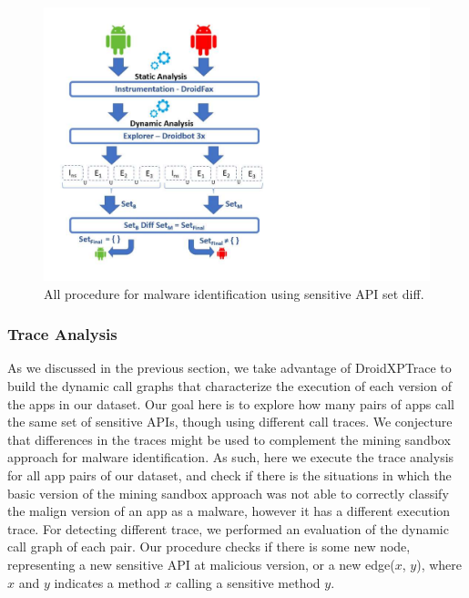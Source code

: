 
\begin{figure}[ht]
\centering
\includegraphics[scale=0.4]{images/sensitiveAPIdiff.pdf}
\caption{All procedure for malware identification using sensitive API set diff.}
 \label{fig:sensitiveAPI}
\end{figure}




\subsubsection{Trace Analysis} \label{sec:pathsetup}


As we discussed in the previous section, we take advantage of DroidXPTrace to build the dynamic call graphs that characterize the execution of each version of the apps in our dataset. Our goal
here is to explore how many pairs of apps call the same set of sensitive APIs, though using different call
traces. We conjecture that differences in the traces might be used to complement the mining sandbox
approach for malware identification. As such, here we execute the trace
analysis for all app pairs of our dataset, and check if there is the situations in which the basic version of the mining sandbox approach was not able to correctly classify the malign version of an app as a malware, however it has a different execution trace. For detecting different trace, we performed an evaluation of the dynamic call graph of each pair. Our procedure checks if there is some new node, representing a new sensitive API at malicious version, or a new edge($x$, $y$), where $x$ and $y$ indicates a method $x$ calling a sensitive method $y$.

